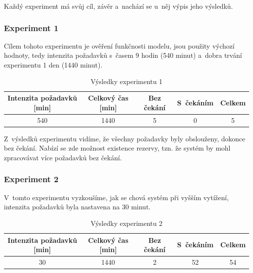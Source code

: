\documentclass[a4paper]{article}
\begin{document}
            Každý experiment má svůj cíl, závěr a~nachází se u~něj výpis jeho výsledků.

            \subsubsection{Experiment 1}
            \label{subsubsec:experiment1}

                Cílem tohoto experimentu je ověření funkčnosti modelu, jsou použity výchozí hodnoty, tedy intenzita požadavků s~časem
                9 hodin (540 minut) a~dobra trvání experimentu 1 den (1440 minut).

                \begin{table}[H]
                    \centering
                    \begin{tabular}{ | c | c | c | c | c | }
                        \hline
                        Intenzita požadavků [min] & Celkový čas [min] & Bez čekání & S~čekáním & Celkem \\
                        \hline
                        \hline
                        540 & 1440 & 5 & 0 & 5 \\
                        \hline
                    \end{tabular}
                    \caption{Výsledky experimentu 1}
                    \label{tab:experiment1}
                \end{table}

                Z~výsledků experimentu vidíme, že všechny požadavky byly obslouženy, dokonce bez čekání.
                Nabízí se zde možnost existence rezervy, tzn. že systém by mohl zpracovávat více požadavků bez čekání.

            \subsubsection{Experiment 2}
            \label{subsubsec:experiment2}

                V~tomto experimentu vyzkoušíme, jak se chová systém při vyšším vytížení, intenzita požadavků byla nastavena na 30 minut.

                \begin{table}[H]
                    \centering
                    \begin{tabular}{ | c | c | c | c | c | }
                        \hline
                        Intenzita požadavků [min] & Celkový čas [min] & Bez čekání & S~čekáním & Celkem \\
                        \hline
                        \hline
                        30 & 1440 & 2 & 52 & 54 \\
                        \hline
                    \end{tabular}
                    \caption{Výsledky experimentu 2}
                    \label{tab:experiment2}
                \end{table}
\end{document}
